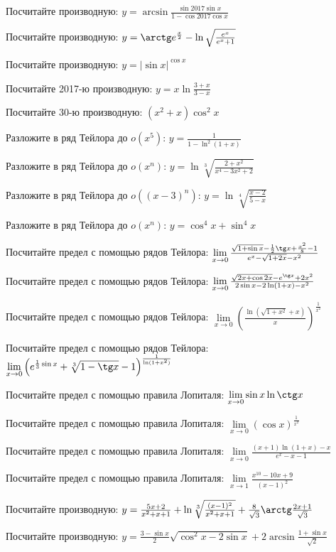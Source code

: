 \documentclass[russian]{article}
\begin{document}
 
 Посчитайте производную:
 $y = \arcsin \frac{\sin 2017 \sin x}{1 - \cos 2017 \cos x}$
 
 Посчитайте производную:
 $y = \arctg e^\frac{x}{2} - \ln \sqrt{\frac{e^x}{e^x + 1}}$
 
 Посчитайте производную:
 $y = |\sin x|^{\cos x}$
 
 Посчитайте 2017-ю производную:
 $y = x\ln\frac{3 + x}{3 - x}$
 
 Посчитайте 30-ю производную:
 $(x^2 + x) \cos^2 x$
 
 
 Разложите в ряд Тейлора до $o(x^5)$:
 $y = \frac{1}{1 - \ln^2(1 + x)}$
 
 Разложите в ряд Тейлора до $o(x^n)$:
 $y = \ln\sqrt[3]{\frac{2 + x^2}{x^4 - 3x^2 + 2}}$
 
 Разложите в ряд Тейлора до $o((x - 3)^n)$:
 $y = \ln\sqrt[4]{\frac{x - 2}{5 - x}}$
 
 Разложите в ряд Тейлора до $o(x^n)$:
 $y = \cos^4 x + \sin^4 x$
 
 
 Посчитайте предел с помощью рядов Тейлора:
 $\lim\limits_{x \to 0} \frac{\sqrt{1 + \sin x} - \frac{1}{2} \tg x + \frac{x^2}{8} - 1}{e^x - \sqrt{1 + 2x} - x^2}$
 
 Посчитайте предел с помощью рядов Тейлора:
 $\lim\limits_{x \to 0} \frac{\sqrt{2x + \cos 2x} - e^{\tg x} + 2x^2}{2 \sin x - 2 \ln(1 + x) - x^2}$
 
 Посчитайте предел с помощью рядов Тейлора:
 $\lim\limits_{x \to 0} \left(\frac{\ln(\sqrt{1 + x^2} + x)}{x}\right)^\frac{1}{x^2}$
 
 Посчитайте предел с помощью рядов Тейлора:
 $\lim\limits_{x \to 0} \left( e^{\frac{1}{3}\sin x} + \sqrt[3]{1 - \tg x} - 1 \right)^\frac{1}{\ln(1 + x^2)}$
 
 
 Посчитайте предел с помощью правила Лопиталя:
 $\lim\limits_{x \to 0} \sin x \ln \ctg x$
 
 Посчитайте предел с помощью правила Лопиталя:
 $\lim\limits_{x \to 0} (\cos x)^\frac{1}{x^2}$
 
 Посчитайте предел с помощью правила Лопиталя:
 $\lim\limits_{x \to 0} \frac{(x + 1) \ln (1 + x) - x}{e^x - x - 1}$
 
 Посчитайте предел с помощью правила Лопиталя:
 $\lim\limits_{x \to 1} \frac{x^{10} - 10 x + 9}{(x - 1)^2}$
 
 
 Посчитайте производную:
 $y = \frac{5x + 2}{x^2 + x + 1} + \ln\sqrt[3]{\frac{(x - 1)^2}{x^2 + x + 1}} + \frac{8}{\sqrt{3}}\arctg\frac{2x + 1}{\sqrt{3}}$
 
 Посчитайте производную:
 $y = \frac{3 - \sin x}{2} \sqrt{\cos^2 x - 2 \sin x} + 2 \arcsin \frac{1 + \sin x}{\sqrt{2}}$
 
\end{document}
